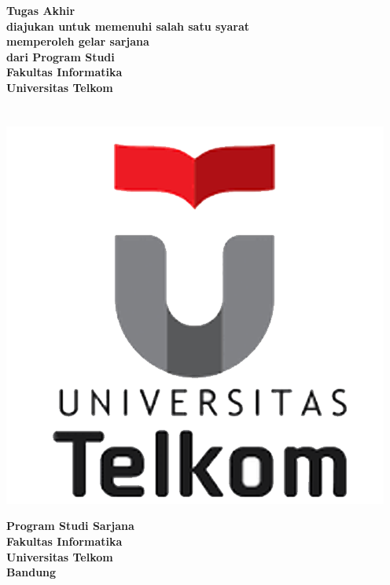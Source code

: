 \begin{center}
   
    \vspace{-0.1cm}{\LARGE \bf \Title}
    
    \vspace{2cm}
    \linespread{1.5}
    \textbf{{\large Tugas Akhir\\
diajukan untuk memenuhi salah satu syarat\\ memperoleh gelar sarjana\\
dari Program Studi \Prodi \\
Fakultas Informatika\\Universitas Telkom\\
\vspace{1cm}
\NIM\\
\Author\\
\vspace{1cm}
\includegraphics[scale=0.18]{universitastelkom.png}
\vspace{2cm}
}}

{\bf \Large Program Studi Sarjana \Prodi\\
Fakultas Informatika\\
Universitas Telkom\\
Bandung\\
\vspace{0.5cm}
\Tahun
}



\end{center}  